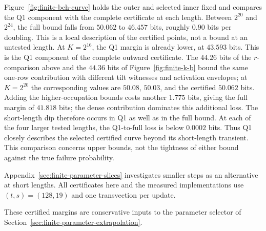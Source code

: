 Figure~\ref{fig:finite-bch-curve} holds the outer and selected inner fixed
and compares the Q1 component with the complete certificate at each length.
Between $2^{20}$ and $2^{24}$, the full bound falls from $50.062$ to
$46.457$ bits, roughly $0.90$ bits per doubling. This is a local description
of the certified points, not a bound at an untested length. At $K=2^{16}$,
the Q1 margin is already lower, at $43.593$ bits. This is the Q1 component
of the complete outward certificate. The $44.26$ bits of the $r$-comparison
above and the $44.36$ bits of Figure~\ref{fig:finite-k-b} bound the same
one-row contribution with different tilt witnesses and activation
envelopes; at $K=2^{20}$ the corresponding values are $50.08$, $50.03$, and
the certified $50.062$ bits. Adding the higher-occupation
bounds costs another $1.775$ bits, giving the full margin of $41.818$ bits;
the dense contribution dominates this additional loss. The short-length
dip therefore occurs in Q1 as well as in the full bound.
At each of the four larger tested lengths, the Q1-to-full loss is below
$0.0002$ bits.
Thus Q1 closely describes the selected certified curve beyond its
short-length transient. This comparison concerns upper bounds, not the
tightness of either bound against the true failure probability.



Appendix~\ref{sec:finite-parameter-slices} investigates smaller steps as
an alternative at short lengths. All certificates here and the measured
implementations use $(t,s)=(128,19)$ and one transvection per update.

These certified margins are conservative inputs to the parameter selector
of Section~\ref{sec:finite-parameter-extrapolation}.

\FloatBarrier


